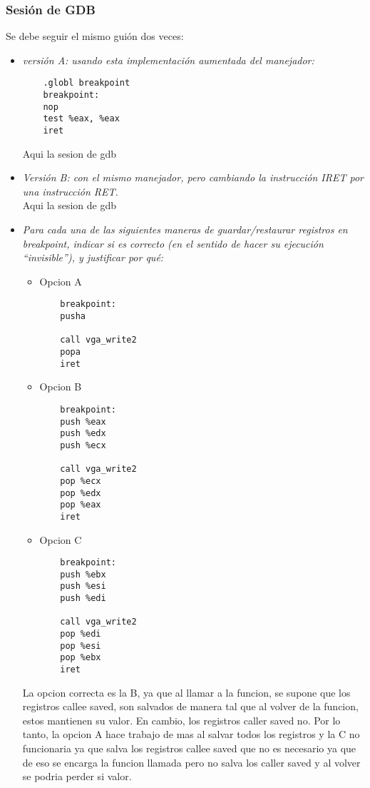 \documentclass[a4paper, 12pt]{article}
\begin{document}
			\subsubsection{Sesión de GDB}
			Se debe seguir el mismo guión dos veces:\\
			\begin{itemize}
				\item \textit{versión A: usando esta implementación aumentada
				del manejador:}
\begin{lstlisting}
	.globl breakpoint
	breakpoint:
	nop
	test %eax, %eax
	iret
\end{lstlisting}
				Aqui la sesion de gdb\\
				\item \textit{Versión B: con el mismo manejador, pero cambiando
				la instrucción IRET por una instrucción RET.\\}
				Aqui la sesion de gdb\\
				\item \textit{Para cada una de las siguientes maneras de
				guardar/restaurar registros en breakpoint, indicar si es
				correcto (en el sentido de hacer su ejecución “invisible”), y
				justificar por qué:}
				\begin{itemize}
					\item Opcion A
\begin{lstlisting}
	breakpoint:
	pusha

	call vga_write2
	popa
	iret
\end{lstlisting}
					\item Opcion B
\begin{lstlisting}
	breakpoint:
	push %eax
	push %edx
	push %ecx

	call vga_write2
	pop %ecx
	pop %edx
	pop %eax
	iret
\end{lstlisting}
					\item Opcion C
\begin{lstlisting}
	breakpoint:
	push %ebx
	push %esi
	push %edi

	call vga_write2
	pop %edi
	pop %esi
	pop %ebx
	iret
\end{lstlisting}
\end{itemize}
					La opcion correcta es la B, ya que al llamar a la funcion,
					se supone que los registros callee saved, son salvados de
					manera tal que al volver de la funcion, estos mantienen
					su valor. En cambio, los registros caller saved no. Por lo
					tanto, la opcion A hace trabajo de mas al salvar todos los
					registros y la C no funcionaria ya que salva los registros
					callee saved que no es necesario ya que de eso se encarga la
					funcion llamada pero no salva los caller saved y al volver
					se podria perder si valor.\\
			\end{itemize}
\end{document}
